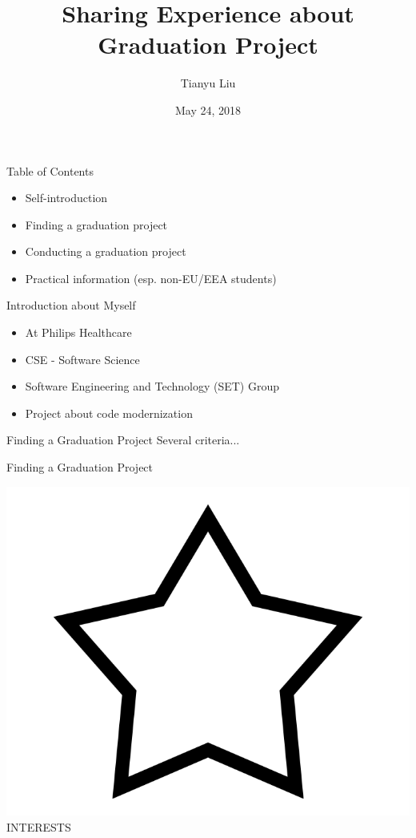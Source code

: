 \documentclass[12pt, aspectratio=43]{beamer}
\title{Sharing Experience about Graduation Project}
\author{Tianyu Liu}
\date{May 24, 2018}
\begin{document}
    
    
\begin{titleframe}
\end{titleframe}

\begin{frame}{Table of Contents}
\begin{itemize}
    \setlength\itemsep{1em}
    \item Self-introduction
    \item Finding a graduation project
    \item Conducting a graduation project
    \item Practical information (esp. non-EU/EEA students)
\end{itemize}
\end{frame}

\begin{frame}{Introduction about Myself}
\begin{itemize}
    \setlength\itemsep{1em}
    \item At Philips Healthcare
    \item CSE - Software Science
    \item Software Engineering and Technology (SET) Group
    \item Project about code modernization
\end{itemize}
\end{frame}

\begin{frame}{Finding a Graduation Project}
Several criteria...
\end{frame}

\begin{frame}{Finding a Graduation Project}
\begin{center}
    \includegraphics[scale=0.3]{images/Interests.png} \\
    INTERESTS
\end{center}
\end{frame}
\end{document}
